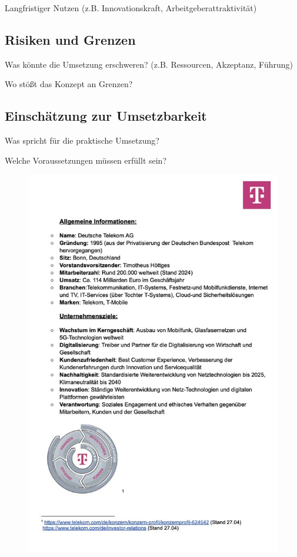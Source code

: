 \documentclass[12pt,a4paper]{article}
\begin{document}
	Langfristiger Nutzen (z.B. Innovationskraft, Arbeitgeberattraktivität)
	\subsection{Risiken und Grenzen}
	Was könnte die Umsetzung erschweren? (z.B. Ressourcen, Akzeptanz, Führung)
	
	Wo stößt das Konzept an Grenzen?
	
	\subsection{Einschätzung zur Umsetzbarkeit}
	Was spricht für die praktische Umsetzung?
	
	Welche Voraussetzungen müssen erfüllt sein?
	
	\newpage
	\printbibliography[heading=bibintoc,title={Literaturverzeichnis}]
	
	
	\newpage
	\thispagestyle{empty} %
	\begin{figure}[H]
		\centering
		\includegraphics{images/Bild1.jpg}
	\end{figure}
	\newpage
	\newpage
\end{document}
